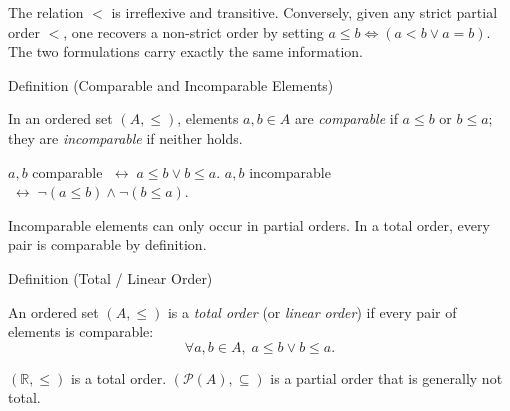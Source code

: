 \begin{remark*}
The relation $<$ is irreflexive and transitive. Conversely, given any strict
partial order $<$, one recovers a non-strict order by setting
$a \leq b \iff (a < b \lor a=b)$. The two formulations carry exactly the
same information.
\end{remark*}

\begin{definitionbox}{Definition (Comparable and Incomparable Elements)}
\begin{definition}\label{def:comparable}
In an ordered set $(A,\leq)$, elements $a,b \in A$ are \emph{comparable} if
$a \leq b$ or $b \leq a$; they are \emph{incomparable} if neither holds.
\end{definition}
\end{definitionbox}

\NoLocalDependencies

\begin{remark*}
$a,b$ comparable $\;\leftrightarrow\; a \leq b \vee b \leq a$. \quad
$a,b$ incomparable $\;\leftrightarrow\; \neg(a \leq b) \wedge \neg(b \leq a)$.
\end{remark*}

\begin{remark*}
Incomparable elements can only occur in partial orders. In a total order,
every pair is comparable by definition.
\end{remark*}

\begin{definitionbox}{Definition (Total / Linear Order)}
\begin{definition}\label{def:linear-order}
An ordered set $(A,\leq)$ is a \emph{total order} (or \emph{linear order})
if every pair of elements is comparable:
\[
\forall a,b \in A,\; a \leq b \lor b \leq a.
\]
\end{definition}
\end{definitionbox}\begin{remark*}[Examples]
$(\mathbb{R},\leq)$ is a total order. $(\mathcal{P}(A), \subseteq)$ is a
partial order that is generally not total.
\end{remark*}

